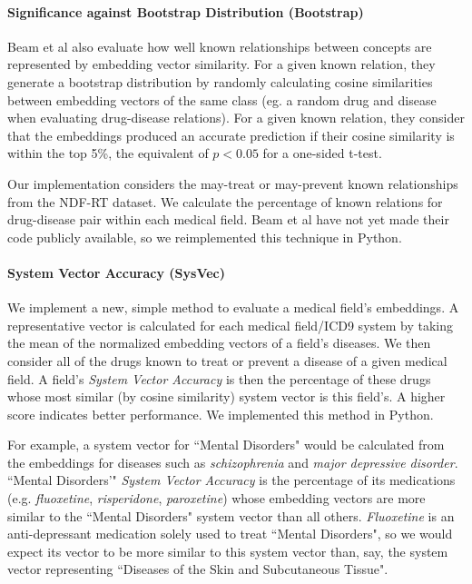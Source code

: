\documentclass[11pt,a4paper]{article}
\begin{document}
\paragraph{Significance against Bootstrap Distribution (Bootstrap)}
Beam et al  also evaluate how well known relationships between concepts are represented by embedding vector similarity. For a given known relation, they generate a bootstrap distribution by randomly calculating cosine similarities between embedding vectors of the same class (eg. a random drug and disease when evaluating  drug-disease relations). For a given known relation, they consider that the embeddings produced an accurate prediction if their cosine similarity is within the top 5\%, the equivalent of $p<0.05$ for a one-sided t-test. 

Our implementation considers the may-treat or may-prevent known relationships from the NDF-RT dataset. We calculate the percentage of known relations for drug-disease pair within each medical field. Beam et al have not yet made their code publicly available, so we reimplemented this technique in Python. 

\paragraph{System Vector Accuracy (SysVec)}
We implement a new, simple method to evaluate a medical field's embeddings. A representative vector is calculated for each medical field/ICD9 system by taking the mean of the normalized embedding vectors of a field's diseases. We then consider all of the drugs known to treat or prevent a disease of a given medical field. A field's \emph{System Vector Accuracy} is then the percentage of these drugs whose most similar (by cosine similarity) system vector is this field's. A higher score indicates better performance. We implemented this method in Python. 

For example, a system vector for ``Mental Disorders" would be calculated from the embeddings for diseases such as \emph{schizophrenia} and \emph{major depressive disorder}. ``Mental Disorders'" \emph{System Vector Accuracy} is the percentage of its medications (e.g. \emph{fluoxetine}, \emph{risperidone}, \emph{paroxetine}) whose embedding vectors are more similar to the ``Mental Disorders" system vector than all others. \emph{Fluoxetine} is an anti-depressant medication solely used to treat ``Mental Disorders", so we would expect its vector to be more similar to this system vector than, say, the system vector representing ``Diseases of the Skin and Subcutaneous Tissue". 
\end{document}
